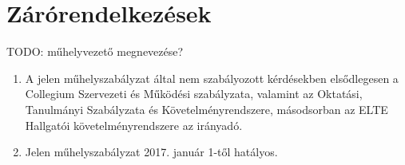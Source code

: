 \documentclass{../styles/rulebook}
\begin{document}
\section{Zárórendelkezések}

TODO: műhelyvezető megnevezése?
\begin{enumerate}
	\item A jelen műhelyszabályzat által nem szabályozott kérdésekben elsődlegesen a Collegium Szervezeti és Működési szabályzata, valamint az Oktatási, Tanulmányi Szabályzata és Követelményrendszere, másodsorban az ELTE Hallgatói követelményrendszere az irányadó.
	\item Jelen műhelyszabályzat 2017. január 1-től hatályos.
\end{enumerate}
\end{document}
